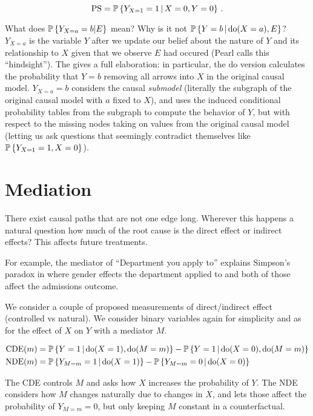 \documentclass{article}
\begin{document}
$$
\textrm{PS}=\operatorname{\mathbb{P}}\left\{ Y_{X=1}=1 \,\middle|\, X=0,Y=0 \right\}\,.
$$

What does $\operatorname{\mathbb{P}}\left\{{Y_{X=a}=b|E}\right\}$ mean? Why is it not $\operatorname{\mathbb{P}}\left\{ Y=b \,\middle|\, \mathrm{do}(X=a), E \right\}$? $Y_{X=a}$ is the variable $Y$ after we update our belief about the nature of $Y$ and its relationship to $X$ given that we observe $E$ had occured (Pearl calls this ``hindsight''). The  gives a full elaboration: in particular, the $\mathrm{do}$ version calculates the probability that $Y=b$ removing all arrows into $X$ in the original causal model. $Y_{X=a}=b$ considers the causal \textit{submodel} (literally the subgraph of the original causal model with $a$ fixed to $X$), and uses the induced conditional probability tables from the subgraph to compute the behavior of $Y$, but with respect to the missing nodes taking on values from the original causal model (letting us ask questions that seemingly contradict themselves like $\operatorname{\mathbb{P}}\left\{{Y_{X=1}=1, X=0}\right\}$).

\section{Mediation}

There exist causal paths that are not one edge long. Wherever this happens a natural question how much of the root cause is the direct effect or indirect effects? This affects future treatments.

For example, the mediator of ``Department you apply to'' explains Simpson's paradox in where gender effects the department applied to and both of those affect the admissions outcome.

We consider a couple of proposed measurements of direct/indirect effect (controlled vs natural). We consider binary variables again for simplicity and as for the effect of $X$ on $Y$ with a mediator $M$.

\begin{align*}
  \mathrm{CDE}(m)&=\operatorname{\mathbb{P}}\left\{ Y=1 \,\middle|\, \mathrm{do}(X=1), \mathrm{do}(M=m) \right\} -\operatorname{\mathbb{P}}\left\{ Y=1 \,\middle|\, \mathrm{do}(X=0), \mathrm{do}(M=m) \right\}\\
  \mathrm{NDE}(m)&=\operatorname{\mathbb{P}}\left\{ Y_{M=m}=1 \,\middle|\, \mathrm{do}(X=1) \right\} -\operatorname{\mathbb{P}}\left\{ Y_{M=m}=0 \,\middle|\, \mathrm{do}(X=0) \right\}
\end{align*}

The CDE controls $M$ and asks how $X$ increases the probability of $Y$. The NDE considers how $M$ changes naturally due to changes in $X$, and lets those affect the probability of $Y_{M=m}=0$, but only keeping $M$ constant in a counterfactual.
\end{document}
